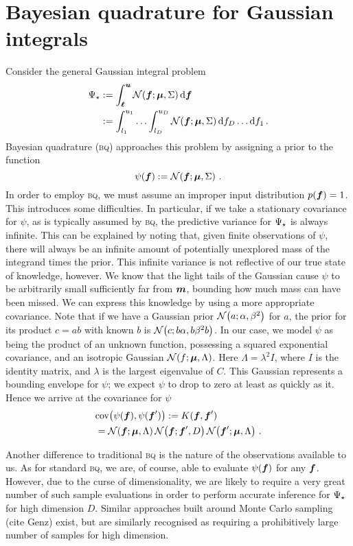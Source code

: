 \documentclass[twoside]{article}
\newcommand{\vm}{\vect{m}}
\newcommand{\vu}{\vect{u}}
\renewcommand{\sc}[1]{{\scshape #1}}
\begin{document}
\section{Bayesian quadrature for Gaussian integrals}

Consider the general Gaussian integral problem
\begin{align}\label{eq:GI}
 \Psi\st & \deq \int_{\vl}^{\vu} \N{\vf}{\vmu}{\Sigma} \ud \vf\nonumber\\
& \deq \int_{l_1}^{u_1}\ldots\int_{l_D}^{u_D} \N{\vf}{\vmu}{\Sigma} \ud f_D \ldots \ud f_1\,.
\end{align}
Bayesian quadrature (\sc{bq}) approaches this problem by assigning a \gpb prior to the function
\begin{equation}
 \psi(\boldsymbol{f}) := \mathcal{N}\!\left(\boldsymbol{f};\boldsymbol{\mu},\Sigma\right)\,.
\end{equation}
In order to employ \sc{bq}, we must assume an improper input distribution $p(\boldsymbol{f}) = 1$. This introduces some difficulties. In particular, if we take a stationary covariance for $\psi$, as is typically assumed by \sc{bq}, the predictive variance for $\Psi_\star$ is always infinite. This can be explained by noting that, given finite observations of $\psi$, there will always be an infinite amount of potentially unexplored mass of the integrand times the prior. This infinite variance is not reflective of our true state of knowledge, however. We know that the light tails of the Gaussian cause $\psi$ to be arbitrarily small sufficiently far from $\vm$, bounding how much mass can have been missed. We can express this knowledge by using a more appropriate covariance. Note that if we have a Gaussian prior $\mathcal{N}\!\left(a;\alpha,\beta^2\right)$ for $a$, the prior for its product $c = a b$ with known $b$ is $\mathcal{N}\!\left(c;b \alpha,b \beta^2 b\right)$. In our case, we model $\psi$ as being the product of an unknown function, possessing a squared 
exponential covariance, and an isotropic Gaussian $\mathcal{N}\!\left(f;\boldsymbol{\mu},\Lambda\right)$. Here $\Lambda = \lambda^2 I$, where $I$ is the identity matrix, and $\lambda$ is the largest eigenvalue of $C$. This Gaussian represents a bounding envelope for $\psi$; we expect $\psi$ to drop to zero at least as quickly as it. Hence we arrive at the covariance for $\psi$
\begin{align}
 & \text{cov}\bigl(\psi(\boldsymbol{f}), \psi(\boldsymbol{f}')\bigr) := K(\boldsymbol{f}, \boldsymbol{f}')\nonumber\\ & = \mathcal{N}\!\left(\boldsymbol{f};\boldsymbol{\mu},\Lambda\right) \mathcal{N}\!\left(\boldsymbol{f};\boldsymbol{f}',D\right) \mathcal{N}\!\left(\boldsymbol{f}';\boldsymbol{\mu},\Lambda\right)\,.
\end{align}

Another difference to traditional \sc{bq} is the nature of the observations available to us. As for standard \sc{bq}, we are, of course, able to evaluate $\psi(\boldsymbol{f})$ for any $\boldsymbol{f}$. However, due to the curse of dimensionality, we are likely to require a very great number of such sample evaluations in order to perform accurate inference for $\Psi_\star$ for high dimension $D$. Similar approaches built around Monte Carlo sampling (cite Genz) exist, but are similarly recognised as requiring a prohibitively large number of samples for high dimension. 
\end{document}
